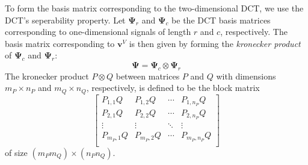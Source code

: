 To form the basis matrix corresponding to the two-dimensional DCT, we use the DCT's seperability property.
Let $\bm\Psi_r$ and $\bm\Psi_c$ be the DCT basis matrices corresponding to one-dimensional signals of length $r$ and $c$, respectively.
The basis matrix corresponding to $\bm v^V$ is then given by forming the \emph{kronecker product} of $\bm\Psi_c$ and $\bm\Psi_r$:
\begin{equation*}
\label{eqn:dct3_basis}
  \bm\Psi = \bm\Psi_c \otimes \bm\Psi_r
\end{equation*}
The kronecker product $P \otimes Q$ between matrices $P$ and $Q$ with dimensions $m_P \times n_P$ and $m_Q \times n_Q$, respectively,  is defined to be the block matrix
\begin{equation*}
\begin{bmatrix}
P_{1,1} Q & P_{1,2} Q & \cdots & P_{1,n_P} Q \\
P_{2,1} Q & P_{2,2} Q & \cdots & P_{2,n_P} Q \\
\vdots&\vdots&\ddots&\vdots \\
P_{m_P,1} Q & P_{m_P,2} Q & \cdots & P_{m_P,n_P} Q \\
\end{bmatrix}
\end{equation*}
of size $(m_Pm_Q) \times (n_Pn_Q)$.

